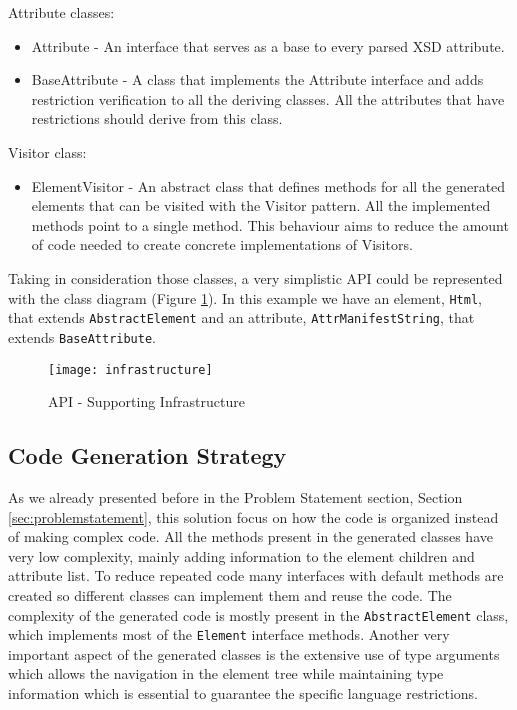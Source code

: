 Attribute classes:

\begin{itemize}  
	\item Attribute - An interface that serves as a base to every parsed \ac{XSD} attribute.
	\item BaseAttribute - A class that implements the Attribute interface and adds restriction verification to all the deriving classes. All the attributes that have restrictions should derive from this class.
\end{itemize}

Visitor class:

\begin{itemize}
	\item ElementVisitor - An abstract class that defines methods for all the generated elements that can be visited with the Visitor pattern. All the implemented methods point to a single method. This behaviour aims to reduce the amount of code needed to create concrete implementations of  Visitors.
\end{itemize}

\noindent
Taking in consideration those classes, a very simplistic \ac{API} could be represented with the class diagram (Figure \ref{img:infrastructure}). In this example we have an element, \texttt{Html}, that extends \texttt{AbstractElement} and an attribute, \texttt{AttrManifestString}, that extends \texttt{BaseAttribute}. 

\begin{figure}[H]
	\centering
	\texttt{[image: infrastructure]}
	\caption{API - Supporting Infrastructure}
	\label{img:infrastructure}
\end{figure}

\subsection{Code Generation Strategy}
\label{sec:codegenerationstrategy}

As we already presented before in the Problem Statement section, Section \ref{sec:problemstatement}, this solution focus on how the code is organized instead of making complex code. All the methods present in the generated classes have very low complexity, mainly adding information to the element children and attribute list. To reduce repeated code many interfaces with default methods are created so different classes can implement them and reuse the code. The complexity of the generated code is mostly present in the \texttt{AbstractElement} class, which implements most of the \texttt{Element} interface methods. Another very important aspect of the generated classes is the extensive use of type arguments which allows the navigation in the element tree while maintaining type information which is essential to guarantee the specific language restrictions.

